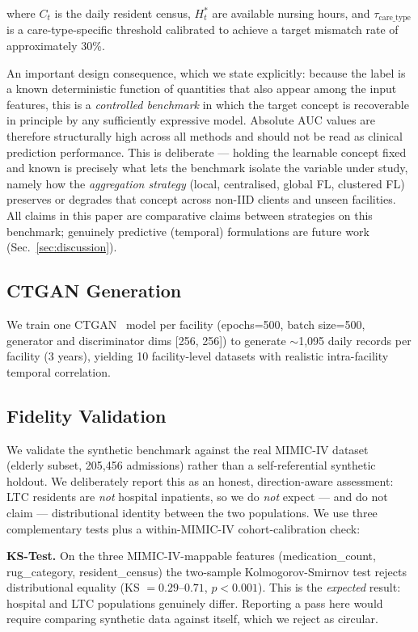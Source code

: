 \documentclass[journal]{IEEEtran}
\begin{document}
where $C_t$ is the daily resident census, $H_t^{*}$ are available nursing
hours, and $\tau_{\text{care\_type}}$ is a care-type-specific threshold
calibrated to achieve a target mismatch rate of approximately 30\%.

An important design consequence, which we state explicitly: because the label
is a known deterministic function of quantities that also appear among the
input features, this is a \emph{controlled benchmark} in which the target
concept is recoverable in principle by any sufficiently expressive model.
Absolute AUC values are therefore structurally high across all methods and
should not be read as clinical prediction performance. This is deliberate ---
holding the learnable concept fixed and known is precisely what lets the
benchmark isolate the variable under study, namely how the \emph{aggregation
strategy} (local, centralised, global FL, clustered FL) preserves or degrades
that concept across non-IID clients and unseen facilities. All claims in this
paper are comparative claims between strategies on this benchmark; genuinely
predictive (temporal) formulations are future work
(Sec.~\ref{sec:discussion}).

\subsection{CTGAN Generation}
We train one CTGAN~\cite{ctgan2019} model per facility (epochs=500, batch size=500, generator
and discriminator dims [256, 256]) to generate $\sim$1{,}095 daily records
per facility (3 years), yielding 10 facility-level datasets with realistic
intra-facility temporal correlation.

\subsection{Fidelity Validation}
We validate the synthetic benchmark against the real MIMIC-IV
dataset~\cite{johnson2023mimic} (elderly subset, 205{,}456 admissions) rather
than a self-referential synthetic holdout. We deliberately report this as an
honest, direction-aware assessment: LTC residents are \emph{not} hospital
inpatients, so we do \emph{not} expect --- and do not claim --- distributional
identity between the two populations. We use three complementary tests plus a
within-MIMIC-IV cohort-calibration check:

\textbf{KS-Test.} On the three MIMIC-IV-mappable features
(medication\_count, rug\_category, resident\_census) the two-sample
Kolmogorov-Smirnov test rejects distributional equality
(KS $= 0.29$--$0.71$, $p < 0.001$). This is the \emph{expected} result:
hospital and LTC populations genuinely differ. Reporting a pass here would
require comparing synthetic data against itself, which we reject as circular.
\end{document}
